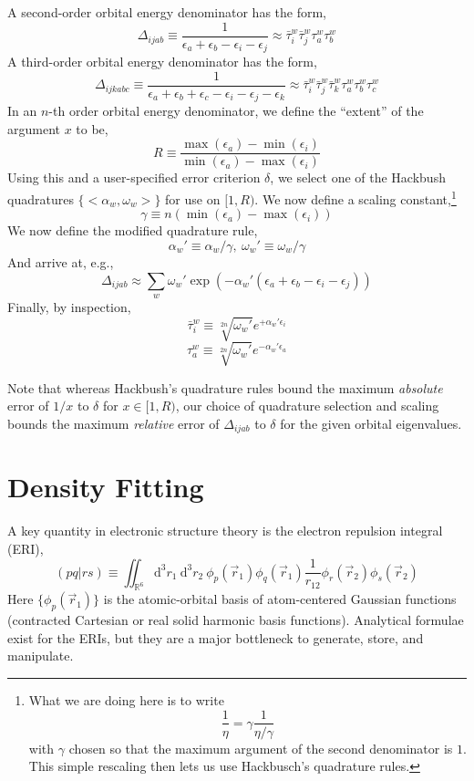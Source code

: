 \documentclass[fleqn,oneside,12pt]{article}
\begin{document}
A second-order orbital energy denominator has the form,
\[
\Delta_{ijab}
\equiv
\frac{1}{
\epsilon_{a} 
+
\epsilon_{b} 
-
\epsilon_{i} 
-
\epsilon_{j} 
}
\approx
\bar \tau_{i}^{w}
\bar \tau_{j}^{w}
\tau_{a}^{w}
\tau_{b}^{w}
\]
A third-order orbital energy denominator has the form,
\[
\Delta_{ijkabc}
\equiv
\frac{1}{
\epsilon_{a} 
+
\epsilon_{b} 
+
\epsilon_{c} 
-
\epsilon_{i} 
-
\epsilon_{j} 
-
\epsilon_{k} 
}
\approx
\bar \tau_{i}^{w}
\bar \tau_{j}^{w}
\bar \tau_{k}^{w}
\tau_{a}^{w}
\tau_{b}^{w}
\tau_{c}^{w}
\]
In an $n$-th order orbital energy denominator, we define the ``extent'' of the
argument $x$ to be,
\[
R 
\equiv
\frac{
\max(\epsilon_{a})
-
\min(\epsilon_{i})
}{
\min(\epsilon_{a})
-
\max(\epsilon_{i})
}
\]
Using this and a user-specified error criterion $\delta$, we select one of the
Hackbush quadratures $\{ < \alpha_{w}, \omega_{w} > \}$ for use on $[1, R)$. We
now define a scaling constant,\footnote{What we are doing here is to write
\[
\frac{1}{\eta}
=
\gamma
\frac{1}{\eta / \gamma}
\]
with $\gamma$ chosen so that the maximum argument of the second denominator is
$1$. This simple rescaling then lets us use Hackbusch's quadrature rules.}
\[
\gamma
\equiv
n
(
\min(\epsilon_{a})
-
\max(\epsilon_{i})
)
\]
We now define the modified quadrature rule,
\[
\alpha_{w}'
\equiv
\alpha_{w}
/
\gamma
,
\
\omega_{w}'
\equiv
\omega_{w}
/
\gamma
\]
And arrive at, e.g.,
\[
\Delta_{ijab}
\approx
\sum_{w}
\omega_{w}'
\exp(- \alpha_{w}' (
\epsilon_{a} 
+
\epsilon_{b} 
-
\epsilon_{i} 
-
\epsilon_{j} 
))
\]
Finally, by inspection,
\[
\bar \tau_{i}^{w}
\equiv
\sqrt[2n]{\omega_{w}'}
e^{+\alpha_{w}' \epsilon_{i}}
\]
\[
\tau_{a}^{w}
\equiv
\sqrt[2n]{\omega_{w}'}
e^{-\alpha_{w}' \epsilon_{a}}
\]

Note that whereas Hackbush's quadrature rules bound the maximum \emph{absolute}
error of $1/x$ to $\delta$ for $x \in [1, R)$, our choice of quadrature
selection and scaling bounds the maximum \emph{relative} error of
$\Delta_{ijab}$ to $\delta$ for the given orbital eigenvalues.

\section{Density Fitting}

A key quantity in electronic structure theory is the electron repulsion
integral (ERI),
\[
(pq|rs)
\equiv
\iint_{\mathbb{R}^6}
\mathrm{d}^3 r_1 \
\mathrm{d}^3 r_2 \
\phi_{p} (\vec r_1)
\phi_{q} (\vec r_1)
\frac{1}{r_{12}}
\phi_{r} (\vec r_2)
\phi_{s} (\vec r_2)
\]
Here $\{ \phi_{p} (\vec r_1) \}$ is the atomic-orbital basis of atom-centered
Gaussian functions (contracted Cartesian or real solid harmonic basis
functions). Analytical formulae exist for the ERIs, but they are a major
bottleneck to generate, store, and manipulate.
\end{document}
